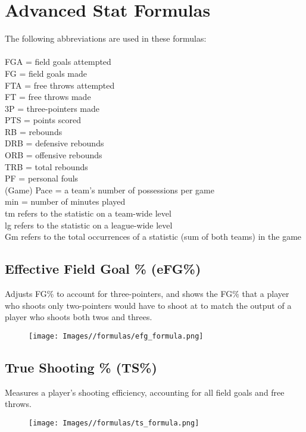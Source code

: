 \documentclass{article}
\begin{document}
\section{Advanced Stat Formulas}
The following abbreviations are used in these formulas:\\
\\
FGA = field goals attempted\\
FG = field goals made\\
FTA = free throws attempted\\
FT = free throws made\\
3P = three-pointers made\\
PTS = points scored\\
RB = rebounds\\
DRB = defensive rebounds\\
ORB = offensive rebounds\\
TRB = total rebounds\\
PF = personal fouls\\
(Game) Pace = a team's number of possessions per game\\
min = number of minutes played\\
tm refers to the statistic on a team-wide level\\
lg refers to the statistic on a league-wide level\\
Gm refers to the total occurrences of a statistic (sum of both teams) in the game

\subsection{Effective Field Goal \% (eFG\%)}
Adjusts FG\% to account for three-pointers, and shows the FG\% that a player who shoots only two-pointers would have to shoot at to match the output of a player who shoots both twos and threes.

\begin{figure}[H]
    \centering
    \texttt{[image: Images//formulas/efg\_formula.png]}
    \label{fig:formula-1}
\end{figure}

\subsection{True Shooting \% (TS\%)}
Measures a player’s shooting efficiency, accounting for all field goals and free throws.
\begin{figure}[H]
    \centering
    \texttt{[image: Images//formulas/ts\_formula.png]}
    \label{fig:formula-2}
\end{figure}
\end{document}
